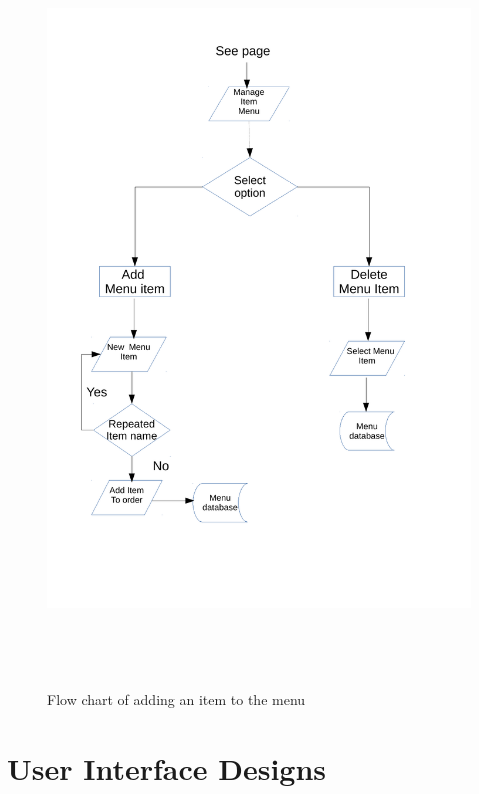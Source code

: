 \begin{figure}[H]
    \includegraphics[height = 20cm]{./Design/Images/flowchart5}
    \caption{Flow chart of adding an item to the menu} \label{fig:Flowchart5}
\end{figure}


\section{User Interface Designs}

